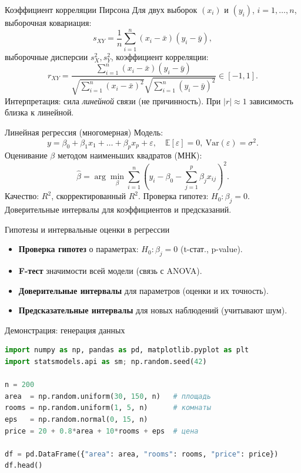 \documentclass{beamer}
\newcommand{\E}{\mathbb{E}}
\newcommand{\Var}{\mathrm{Var}}
\begin{document}
\begin{frame}{Коэффициент корреляции Пирсона}
Для двух выборок $(x_i)$ и $(y_i)$, $i=1,\dots,n$, выборочная ковариация:
\[
s_{XY}=\frac{1}{n}\sum_{i=1}^n (x_i-\bar x)(y_i-\bar y),
\]
выборочные дисперсии $s_X^2, s_Y^2$, коэффициент корреляции:
\[
r_{XY}=\frac{\sum_{i=1}^n (x_i-\bar x)(y_i-\bar y)}
{\sqrt{\sum_{i=1}^n (x_i-\bar x)^2}\sqrt{\sum_{i=1}^n (y_i-\bar y)^2}}\in[-1,1].
\]
Интерпретация: сила \emph{линейной} связи (не причинность). При $|r|\approx 1$ зависимость близка к линейной.
\end{frame}


\begin{frame}{Линейная регрессия (многомерная)}
Модель:
\[
y=\beta_0+\beta_1x_1+\dots+\beta_px_p+\varepsilon,\quad \E[\varepsilon]=0,\ \Var(\varepsilon)=\sigma^2.
\]
Оценивание $\beta$ методом наименьших квадратов (МНК):
\[
\widehat\beta=\arg\min_\beta \sum_{i=1}^n (y_i-\beta_0-\sum_{j=1}^p\beta_j x_{ij})^2.
\]
Качество: $R^2$, скорректированный $R^2$. Проверка гипотез: $H_0:\beta_j=0$. Доверительные интервалы для коэффициентов и предсказаний.
\end{frame}

\begin{frame}{Гипотезы и интервальные оценки в регрессии}
\begin{itemize}
  \item \textbf{Проверка гипотез} о параметрах: $H_0:\beta_j=0$ (t-стат., p-value).
  \item \textbf{F-тест} значимости всей модели (связь с ANOVA).
  \item \textbf{Доверительные интервалы} для параметров (оценки и их точность).
  \item \textbf{Предсказательные интервалы} для новых наблюдений (учитывают шум).
\end{itemize}
\end{frame}


\begin{frame}[fragile]{Демонстрация: генерация данных}
\begin{lstlisting}[language=Python]
import numpy as np, pandas as pd, matplotlib.pyplot as plt
import statsmodels.api as sm; np.random.seed(42)

n = 200
area  = np.random.uniform(30, 150, n)   # площадь
rooms = np.random.uniform(1, 5, n)      # комнаты
eps   = np.random.normal(0, 15, n)
price = 20 + 0.8*area + 10*rooms + eps  # цена

df = pd.DataFrame({"area": area, "rooms": rooms, "price": price})
df.head()
\end{lstlisting}
\end{frame}
\end{document}
